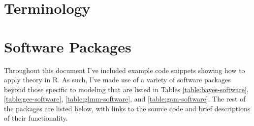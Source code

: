 \documentclass{report}
\begin{document}
\appendix

\chapter{Terminology}\label{chap:appendix}

\glsfindwidesttoplevelname
{}
\printglossary[type=\acronymtype]
\renewcommand*{\glsnamefont}[1]{\textmd{#1}}
\printunsrtglossary[type=symbols]

\chapter{Software Packages} \label{chap:software}

Throughout this document I've included example code snippets showing how to apply theory in R. As such, I've made use of a variety of software packages beyond those specific to modeling that are listed in Tables \ref{table:bayes-software}, \ref{table:gee-software}, \ref{table:glmm-software}, and \ref{table:gam-software}. The rest of the packages are listed below, with links to the source code and brief descriptions of their functionality. 
\end{document}

